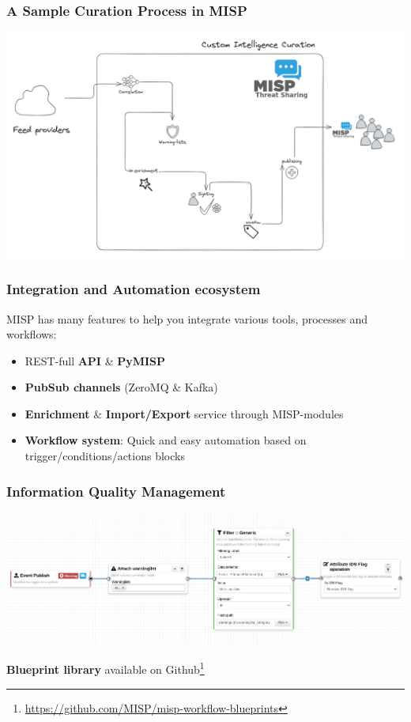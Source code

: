 \begin{frame}
    \frametitle{A Sample Curation Process in MISP}
    \begin{center}
        \includegraphics[width=0.84\linewidth]{curation.png}
    \end{center}
\end{frame}

\begin{frame}
    \frametitle{Integration and Automation ecosystem}
    MISP has many features to help you integrate various tools, processes and workflows:
    \begin{itemize}
        \item REST-full \textbf{API} \& \textbf{PyMISP}
        \item \textbf{PubSub channels} (ZeroMQ \& Kafka)
        \item \textbf{Enrichment} \& \textbf{Import/Export} service through MISP-modules
        \item \textbf{Workflow system}: Quick and easy automation based on trigger/conditions/actions blocks
    \end{itemize}
\end{frame}

\begin{frame}
    \frametitle{Information Quality Management}
    \begin{center}
        \includegraphics[width=0.99\linewidth]{wf-false-positive.png}
    \end{center}
    \begin{center}
        \textbf{Blueprint library} available on Github\footnote{\url{https://github.com/MISP/misp-workflow-blueprints}}
    \end{center}
\end{frame}

